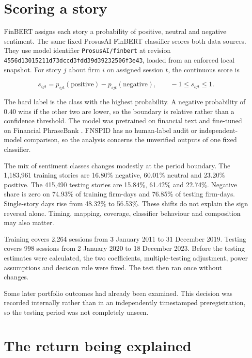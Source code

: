 \section{Scoring a story}

FinBERT assigns each story a probability of positive, neutral and negative
sentiment. The same fixed ProsusAI FinBERT classifier scores both data sources.
They use model identifier \texttt{ProsusAI/finbert} at revision
\texttt{4556d13015211d73\allowbreak dccd3fdd39d39232506f3e43}, loaded from an
enforced local snapshot. For story $j$ about firm $i$ on assigned session $t$,
the continuous score is

\begin{equation}
 s_{ijt}=p_{ijt}(\mathrm{positive})-p_{ijt}(\mathrm{negative}),
 \qquad -1\leq s_{ijt}\leq 1.
 \label{eq:continuous-score}
\end{equation}

The hard label is the class with the highest probability. A negative probability
of 0.40 wins if the other two are lower, so the boundary is relative rather than
a confidence threshold. The model was pretrained on financial text and
fine-tuned on Financial PhraseBank \citep{araci2019}. FNSPID has no human-label
audit or independent-model comparison, so the analysis concerns the unverified
outputs of one fixed classifier.

The mix of sentiment classes changes modestly at the period boundary. The
1,183,961 training
stories are 16.80\% negative, 60.01\% neutral and 23.20\% positive. The 415,490
testing stories are 15.84\%, 61.42\% and 22.74\%. Negative share is zero on
74.93\% of training firm-days and 76.85\% of testing firm-days. Single-story
days rise from 48.32\% to 56.53\%. These shifts do not explain the sign reversal
alone. Timing, mapping, coverage, classifier behaviour and composition may also
matter.

Training covers 2,264 sessions from 3 January 2011 to 31 December 2019. Testing
covers 998 sessions from 2 January 2020 to 18 December 2023. Before the testing
estimates were calculated, the two coefficients, multiple-testing adjustment,
power assumptions and decision rule were fixed. The test then ran once without
changes.

Some later portfolio outcomes had already been examined. This decision was
recorded internally rather than in an independently timestamped
preregistration, so the testing period was not completely unseen.

\section{The return being explained}

